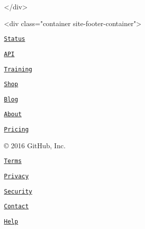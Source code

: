    

\begin{DoxyVerb}</div>
\end{DoxyVerb}
 

  \begin{DoxyVerb}<div class="container site-footer-container">
\end{DoxyVerb}
  
\begin{DoxyItemize}
\item \href{https://status.github.com/}{\tt Status} 
\item \href{https://developer.github.com}{\tt A\+P\+I} 
\item \href{https://training.github.com}{\tt Training} 
\item \href{https://shop.github.com}{\tt Shop} 
\item \href{https://github.com/blog}{\tt Blog} 
\item \href{https://github.com/about}{\tt About} 
\item \href{https://github.com/pricing}{\tt Pricing}


\end{DoxyItemize}

 \href{https://github.com}{\tt } 
\begin{DoxyItemize}
\item \copyright{} 2016 Git\+Hub, Inc. 
\item \href{https://github.com/site/terms}{\tt Terms} 
\item \href{https://github.com/site/privacy}{\tt Privacy} 
\item \href{https://github.com/security}{\tt Security} 
\item \href{https://github.com/contact}{\tt Contact} 
\item \href{https://help.github.com}{\tt Help} 
\end{DoxyItemize} 

